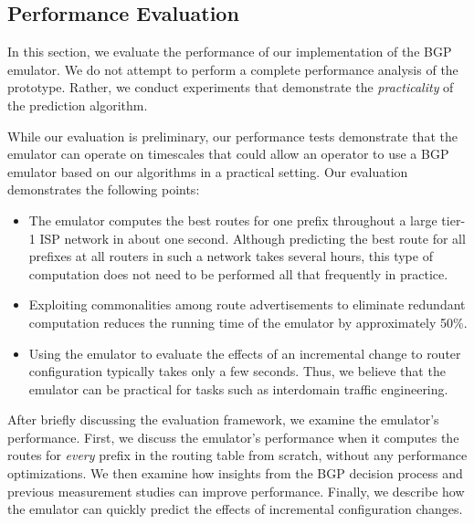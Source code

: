 
\subsection{Performance Evaluation}
\label{sec:performance}


In this section, we evaluate the performance of our implementation of
the BGP emulator.  We do not attempt to perform a complete performance
analysis of the prototype.
Rather, we conduct
experiments that demonstrate the {\em practicality} of the prediction
algorithm.  

While our evaluation is preliminary, our performance tests demonstrate
that the emulator can operate on timescales that could allow an operator
to use a 
BGP emulator based on our algorithms in a practical setting.  
Our evaluation demonstrates the
following points:
\begin{itemize}
\item The emulator computes the best routes for one prefix throughout a
  large tier-1 ISP network in about one second.  Although predicting the
  best route for all prefixes at all routers in such a
  network takes several hours, this type of computation does not need to
  be performed all that frequently in practice.
\item Exploiting commonalities among route advertisements
  to eliminate redundant computation reduces
  the running time of the emulator by approximately 50\%.
\item Using the emulator to evaluate the effects of an incremental
  change to router configuration typically takes only a few seconds.
  Thus, we believe that the emulator can be practical for tasks
  such as interdomain traffic engineering.
\end{itemize}


After briefly discussing the evaluation framework, we examine the
emulator's performance.  First, we discuss the emulator's performance
when it computes the routes for {\em every} prefix in the routing table
from scratch, without any performance optimizations.  We then examine
how insights from the BGP decision process and previous measurement
studies can improve performance.  Finally, we describe how the emulator
can quickly predict the effects of incremental configuration changes.



